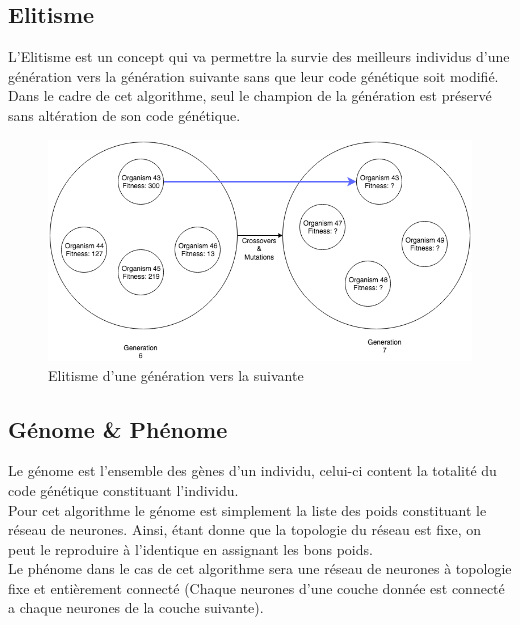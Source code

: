 \documentclass{article}
\begin{document}
\subsection{Elitisme}

L'Elitisme est un concept qui va permettre la survie des meilleurs individus d'une génération vers la génération suivante sans que leur code génétique soit modifié.\\

Dans le cadre de cet algorithme, seul le champion de la génération est préservé sans altération de son code génétique.

\begin{figure}[h]
\begin{center}
	\includegraphics[scale=0.6]{elitism.png}
	\caption{Elitisme d'une génération vers la suivante}
\end{center}
\end{figure}

\subsection{Génome \& Phénome}

Le génome est l'ensemble des gènes d'un individu, celui-ci content la totalité du code génétique constituant l'individu.\\

Pour cet algorithme le génome est simplement la liste des poids constituant le réseau de neurones. Ainsi, étant donne que la topologie du réseau est fixe, on peut le reproduire à l'identique en assignant les bons poids.\\

Le phénome dans le cas de cet algorithme sera une réseau de neurones à topologie fixe et entièrement connecté (Chaque neurones d'une couche donnée est connecté a chaque neurones de la couche suivante). 
\end{document}
